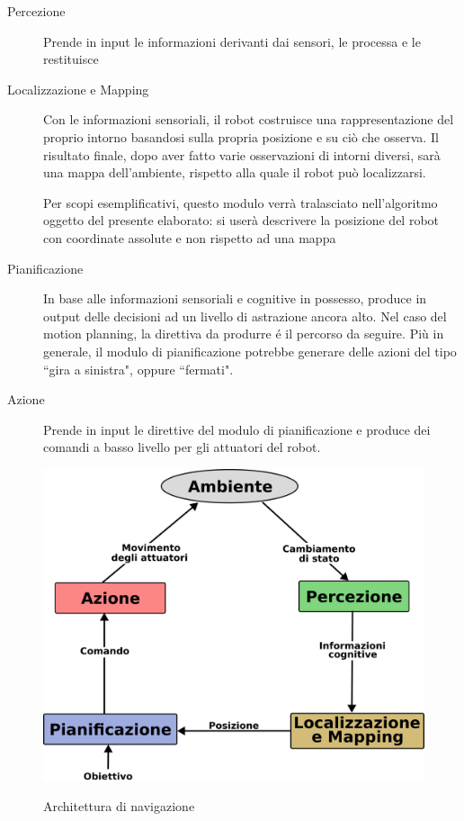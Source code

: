 \documentclass[14pt,a4paper]{extarticle}
\begin{document}
\begin{description}
\item[Percezione] Prende in input le informazioni derivanti dai sensori, le processa e le restituisce
\item[Localizzazione e Mapping] Con le informazioni sensoriali, il robot costruisce una rappresentazione del proprio intorno basandosi sulla propria posizione e su ciò che osserva. Il risultato finale, dopo aver fatto varie osservazioni di intorni diversi, sarà una mappa dell'ambiente, rispetto alla quale il robot può localizzarsi. 
\begin{nota}
Per scopi esemplificativi, questo modulo verrà tralasciato nell'algoritmo oggetto del presente elaborato: si userà descrivere la posizione del robot con coordinate assolute e non rispetto ad una mappa
\end{nota}
\item[Pianificazione] In base alle informazioni sensoriali e cognitive in possesso, produce in output delle decisioni ad un livello di astrazione ancora alto. Nel caso del motion planning, la direttiva da produrre é il percorso da seguire. Più in generale, il modulo di pianificazione potrebbe generare delle azioni del tipo ``gira a sinistra", oppure ``fermati".
\item[Azione] Prende in input le direttive del modulo di pianificazione e produce dei comandi a basso livello per gli attuatori del robot.
\end{description}

\begin{figure}[H]
\caption{Architettura di navigazione}
\centering
\includegraphics{architecture_tesi.png}
\label{arch}
\end{figure}
\end{document}
